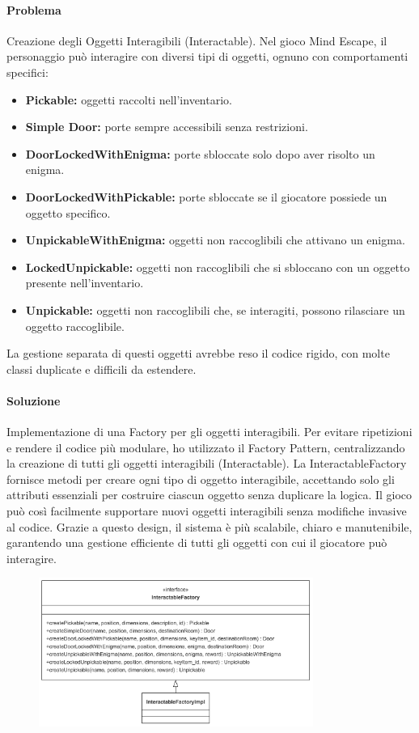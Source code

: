 \documentclass[a4paper,12pt]{report}
\begin{document}
\paragraph{Problema} %
Creazione degli Oggetti Interagibili (Interactable).
Nel gioco Mind Escape, il personaggio può interagire con diversi tipi di oggetti, ognuno con comportamenti specifici:
\begin{itemize}
	\item \textbf{Pickable:} oggetti raccolti nell'inventario.
	\item \textbf{Simple Door:} porte sempre accessibili senza restrizioni.
	\item \textbf{DoorLockedWithEnigma:} porte sbloccate solo dopo aver risolto un enigma.
	\item \textbf{DoorLockedWithPickable:} porte sbloccate se il giocatore possiede un oggetto specifico.
	\item \textbf{UnpickableWithEnigma:} oggetti non raccoglibili che attivano un enigma.
	\item \textbf{LockedUnpickable:} oggetti non raccoglibili che si sbloccano con un oggetto presente nell'inventario.
	\item \textbf{Unpickable:} oggetti non raccoglibili che, se interagiti, possono rilasciare un oggetto raccoglibile.
\end{itemize}
La gestione separata di questi oggetti avrebbe reso il codice rigido, con molte classi duplicate e difficili da estendere.
\paragraph{Soluzione} %
Implementazione di una Factory per gli oggetti interagibili.
Per evitare ripetizioni e rendere il codice più modulare, ho utilizzato il Factory Pattern, centralizzando la creazione di tutti gli oggetti interagibili (Interactable). La InteractableFactory fornisce metodi per creare ogni tipo di oggetto interagibile, accettando solo gli attributi essenziali per costruire ciascun oggetto senza duplicare la logica.
Il gioco può così facilmente supportare nuovi oggetti interagibili senza modifiche invasive al codice.
Grazie a questo design, il sistema è più scalabile, chiaro e manutenibile, garantendo una gestione efficiente di tutti gli oggetti con cui il giocatore può interagire.
\begin{figure} 
    \centering
    \includegraphics[width=0.8\textwidth]{img/interactableFactory.png}
    \label{img:interactableFactory}
\end{figure}
\end{document}
